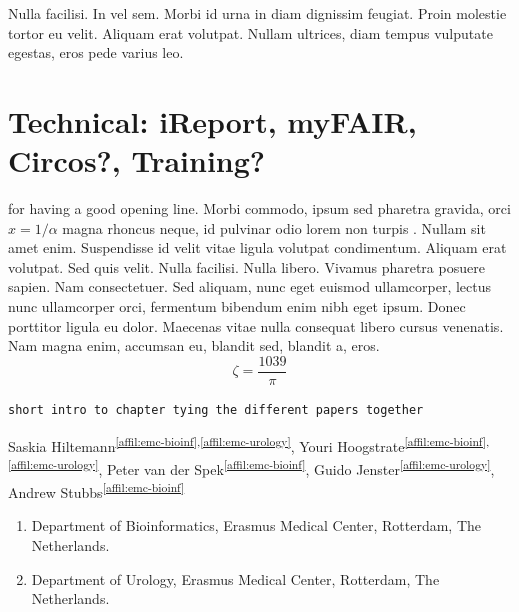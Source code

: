 \begin{savequote}[75mm]
Nulla facilisi. In vel sem. Morbi id urna in diam dignissim feugiat. Proin molestie tortor eu velit. Aliquam erat volutpat. Nullam ultrices, diam tempus vulputate egestas, eros pede varius leo.
\end{savequote}

\chapter{Technical: iReport, myFAIR, Circos?, Training?}
\setcounter{figure}{-1}
\setcounter{table}{-1}
\setcounter{section}{-1}


 for having a good opening line. Morbi commodo, ipsum sed pharetra gravida, orci  $x = 1/\alpha$ magna rhoncus neque, id pulvinar odio lorem non turpis \cite{Eigen1971, Knuth1968}. Nullam sit amet enim. Suspendisse id velit vitae ligula volutpat condimentum. Aliquam erat volutpat. Sed quis velit. Nulla facilisi. Nulla libero. Vivamus pharetra posuere sapien. Nam consectetuer. Sed aliquam, nunc eget euismod ullamcorper, lectus nunc ullamcorper orci, fermentum bibendum enim nibh eget ipsum. Donec porttitor ligula eu dolor. Maecenas vitae nulla consequat libero cursus venenatis. Nam magna enim, accumsan eu, blandit sed, blandit a, eros.
$$\zeta = \frac{1039}{\pi}$$

\verb+short intro to chapter tying the different papers together +

\newpage


Saskia Hiltemann\textsuperscript{\ref{affil:emc-bioinf},\ref{affil:emc-urology}},
Youri Hoogstrate\textsuperscript{\ref{affil:emc-bioinf},\ref{affil:emc-urology}},
Peter van der Spek\textsuperscript{\ref{affil:emc-bioinf}},
Guido Jenster\textsuperscript{\ref{affil:emc-urology}},
Andrew Stubbs\textsuperscript{\ref{affil:emc-bioinf}}

\small
\begin{enumerate}
\itemsep-0.5em
\item Department of Bioinformatics, Erasmus Medical Center, Rotterdam, The Netherlands. \label{affil:emc-bioinf}
\item Department of Urology, Erasmus Medical Center, Rotterdam, The Netherlands. \label{affil:emc-urology}
\end{enumerate}
\normalsize


